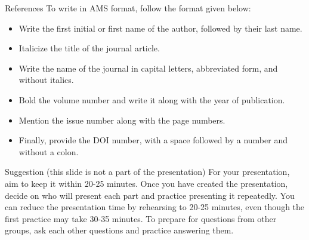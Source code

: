 \documentclass{beamer}
\begin{document}
\begin{frame}{References}
    To write in AMS format, follow the format given below:
\begin{itemize}
    \item Write the first initial or first name of the author, followed by their last name.
    \item Italicize the title of the journal article.
    \item Write the name of the journal in capital letters, abbreviated form, and without italics.
    \item Bold the volume number and write it along with the year of publication.
    \item Mention the issue number along with the page numbers.
    \item Finally, provide the DOI number, with a space followed by a number and without a colon.
\end{itemize}



{\small}

\end{frame}

\begin{frame}{Suggestion (this slide is not a part of the presentation)}
    For your presentation, aim to keep it within 20-25 minutes. Once you have created the presentation, decide on who will present each part and practice presenting it repeatedly. You can reduce the presentation time by rehearsing to 20-25 minutes, even though the first practice may take 30-35 minutes. To prepare for questions from other groups, ask each other questions and practice answering them.
\end{frame}
\end{document}
